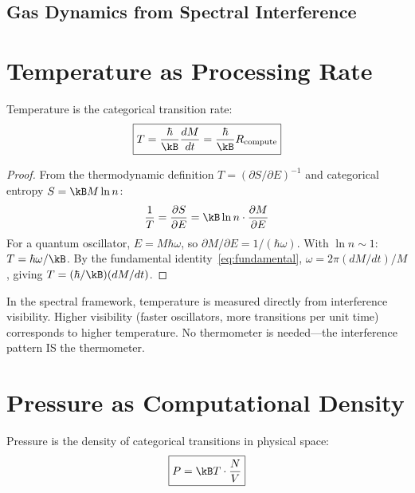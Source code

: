 \subsection{Gas Dynamics from Spectral Interference}
\label{part:gas_dynamics}

\section{Temperature as Processing Rate}
\label{sec:temperature}

\begin{theorem}
\label{thm:temperature}
Temperature is the categorical transition rate:
\begin{equation}
\boxed{T = \frac{\hbar}{\kB}\frac{dM}{dt} = \frac{\hbar}{\kB}R_{\mathrm{compute}}}
\end{equation}
\end{theorem}

\begin{proof}
From the thermodynamic definition $T = (\partial S/\partial E)^{-1}$ and categorical entropy $S = \kB M \ln n$:
\begin{equation}
    \frac{1}{T} = \frac{\partial S}{\partial E} = \kB \ln n \cdot \frac{\partial M}{\partial E}
\end{equation}
For a quantum oscillator, $E = M\hbar\omega$, so $\partial M/\partial E = 1/(\hbar\omega)$. With $\ln n \sim 1$: $T = \hbar\omega/\kB$. By the fundamental identity~\eqref{eq:fundamental}, $\omega = 2\pi(dM/dt)/M$, giving $T = (\hbar/\kB)(dM/dt)$.
\end{proof}

\begin{corollary}
In the spectral framework, temperature is measured directly from interference visibility. Higher visibility (faster oscillators, more transitions per unit time) corresponds to higher temperature. No thermometer is needed---the interference pattern IS the thermometer.
\end{corollary}

\section{Pressure as Computational Density}
\label{sec:pressure}

\begin{theorem}
\label{thm:pressure}
Pressure is the density of categorical transitions in physical space:
\begin{equation}
\boxed{P = \kB T \cdot \frac{N}{V}}
\end{equation}
\end{theorem}

